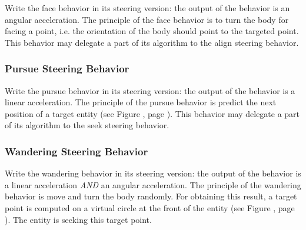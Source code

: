\documentclass[article,english,nodocumentinfo]{multiagentfrreport}
\begin{document}
Write the face behavior in its steering version: the output of the behavior is an angular acceleration.
The principle of the face behavior is to turn the body for facing a point, i.e. the orientation of the body should point to the targeted point.
This behavior may delegate a part of its algorithm to the align steering behavior.

\subsubsection{Pursue Steering Behavior}

Write the pursue behavior in its steering version: the output of the behavior is a linear acceleration.
The principle of the pursue behavior is predict the next position of a target entity (see Figure , page ).
This behavior may delegate a part of its algorithm to the seek steering behavior.


\subsubsection{Wandering Steering Behavior}

Write the wandering behavior in its steering version: the output of the behavior is a linear acceleration \emph{AND} an angular acceleration.
The principle of the wandering behavior is move and turn the body randomly.
For obtaining this result, a target point is computed on a virtual circle at the front of the entity (see Figure , page ).
The entity is seeking this target point.

\end{document}
